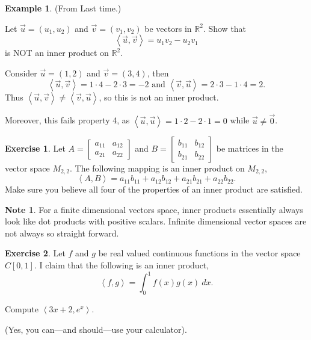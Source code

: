 \documentclass{beamer}
\newcommand{\R}{\mathbb{R}}
\newcommand{\fn}{\insertframenumber}
\newcommand{\ip}[2]{\left\langle #1,#2\right\rangle}
\theoremstyle{definition}
\newtheorem{exercise}{Exercise}
\newtheorem*{exa}{Example}
\newtheorem*{nb}{Note}
\begin{document}
\begin{frame}{\fn}
	\begin{exa} (From Last time.)
		
		Let $\vec u=(u_1,u_2)$ and $\vec v=(v_1,v_2)$ be vectors in $\R^2$.  Show that
		\[\ip{\vec u}{\vec v}=u_1v_2-u_2v_1\]
		is NOT an inner product on $\R^2$.  
		
		Consider $\vec u=(1,2)$ and $\vec v=(3,4)$, then 
			\[\ip{\vec u}{\vec v}=1\cdot 4-2\cdot 3=-2\text{ and }\ip{\vec v}{\vec u}=2\cdot 3-1\cdot 4=2.\]
		Thus $\ip{\vec u}{\vec v}\neq\ip{\vec v}{\vec u}$, so this is not an inner product.
		
		Moreover, this fails property 4, as $\ip{\vec u}{\vec u}=1\cdot 2-2\cdot 1=0$ while $\vec u\neq\vec 0$.
	\end{exa}
\end{frame}
\begin{frame}{\fn}
	\begin{exercise}\label{MatInnerProd}
		Let $A=\begin{bmatrix} a_{11}&a_{12}\\a_{21}&a_{22}\end{bmatrix}$ and $B=\begin{bmatrix}b_{11}&b_{12}\\b_{21}&b_{22}\end{bmatrix}$ be matrices in the vector space $M_{2,2}$.  The following mapping is an inner product on $M_{2,2}$,
			\[\ip{A}{B}=a_{11}b_{11}+a_{12}b_{12}+a_{21}b_{21}+a_{22}b_{22}.\]
		Make sure you believe all four of the properties of an inner product are satisfied.
	\end{exercise}
	\begin{nb}
		For a finite dimensional vectors space, inner products essentially always look like dot products with positive scalars.  Infinite dimensional vector spaces are not always so straight forward.
	\end{nb}
\end{frame}
\begin{frame}{\fn}
	\begin{exercise}
		Let $f$ and $g$ be real valued continuous functions in the vector space $C[0,1]$.  I claim that the following is an inner product,\[\ip{f}{g}=\int_0^1 f(x)g(x)\ dx.\]
		
		Compute $\ip{3x+2}{e^x}$. 
		
		(Yes, you can---and should---use your calculator).
	\end{exercise}
\end{frame}
\end{document}

